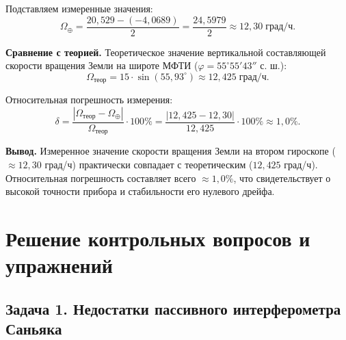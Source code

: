\documentclass[12pt, a4paper]{article}
\begin{document}
Подставляем измеренные значения:
\begin{equation}
    \Omega_{\oplus} = \frac{20{,}529 - (-4{,}0689)}{2} = \frac{24{,}5979}{2} \approx 12{,}30 \; \text{град/ч}.
\end{equation}

\textbf{Сравнение с теорией.} Теоретическое значение вертикальной составляющей скорости вращения Земли на широте МФТИ ($\varphi = 55^\circ 55' 43''$ с. ш.):
\begin{equation}
    \Omega_{\text{теор}} = 15 \cdot \sin(55{,}93^\circ) \approx 12{,}425 \; \text{град/ч}.
\end{equation}

Относительная погрешность измерения:
\begin{equation}
    \delta = \frac{|\Omega_{\text{теор}} - \Omega_{\oplus}|}{\Omega_{\text{теор}}} \cdot 100\% = \frac{|12{,}425 - 12{,}30|}{12{,}425} \cdot 100\% \approx 1{,}0\%.
\end{equation}

\textbf{Вывод.} Измеренное значение скорости вращения Земли на втором гироскопе ($\approx 12{,}30$ град/ч) практически совпадает с теоретическим ($12{,}425$ град/ч). Относительная погрешность составляет всего $\approx 1{,}0\%$, что свидетельствует о высокой точности прибора и стабильности его нулевого дрейфа. 


















\section*{Решение контрольных вопросов и упражнений}

\subsection*{Задача 1. Недостатки пассивного интерферометра Саньяка}
\end{document}
